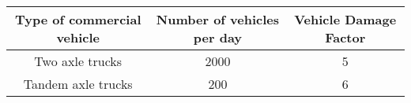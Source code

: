 \begin{center}
	\begin{tabular}{|c|c|c|}
		\hline
		Type of commercial vehicle & Number of vehicles per day & Vehicle Damage Factor \\
		\hline
		Two axle trucks & 2000 & 5 \\
		Tandem axle trucks & 200 & 6 \\
		\hline
	\end{tabular}
\end{center}